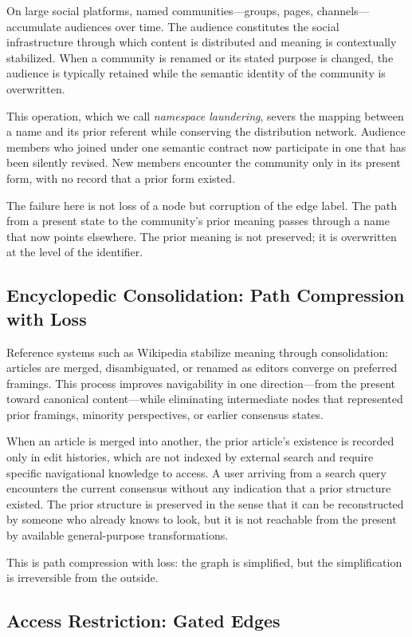 \documentclass[12pt]{article}
\begin{document}
On large social platforms, named communities---groups, pages, channels---
accumulate audiences over time.
The audience constitutes the social infrastructure through which content
is distributed and meaning is contextually stabilized.
When a community is renamed or its stated purpose is changed, the audience
is typically retained while the semantic identity of the community is
overwritten.

This operation, which we call \emph{namespace laundering}, severs the mapping
between a name and its prior referent while conserving the distribution
network.
Audience members who joined under one semantic contract now participate in
one that has been silently revised.
New members encounter the community only in its present form, with no record
that a prior form existed.

The failure here is not loss of a node but corruption of the edge label.
The path from a present state to the community's prior meaning passes through
a name that now points elsewhere.
The prior meaning is not preserved; it is overwritten at the level of the
identifier.

\subsection{Encyclopedic Consolidation: Path Compression with Loss}

Reference systems such as Wikipedia stabilize meaning through consolidation:
articles are merged, disambiguated, or renamed as editors converge on
preferred framings.
This process improves navigability in one direction---from the present toward
canonical content---while eliminating intermediate nodes that represented
prior framings, minority perspectives, or earlier consensus states.

When an article is merged into another, the prior article's existence is
recorded only in edit histories, which are not indexed by external search
and require specific navigational knowledge to access.
A user arriving from a search query encounters the current consensus without
any indication that a prior structure existed.
The prior structure is preserved in the sense that it can be reconstructed
by someone who already knows to look, but it is not reachable from the
present by available general-purpose transformations.

This is path compression with loss: the graph is simplified, but the
simplification is irreversible from the outside.

\subsection{Access Restriction: Gated Edges}
\end{document}
